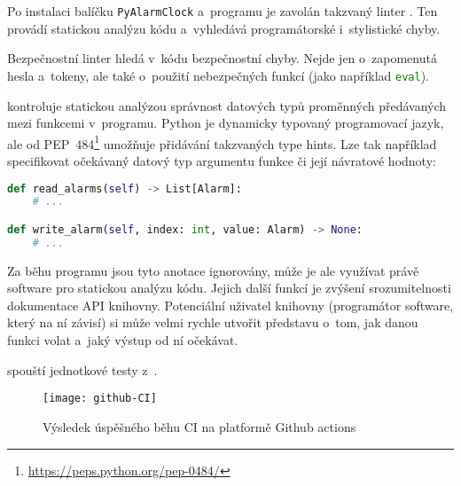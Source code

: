 Po instalaci balíčku \texttt{PyAlarmClock} a~programu  je
zavolán takzvaný linter . Ten provádí statickou analýzu kódu
a~vyhledává programátorské i~stylistické chyby.

Bezpečnostní linter  hledá v~kódu bezpečnostní chyby. Nejde
jen o~zapomenutá hesla a~tokeny, ale také o~použití nebezpečných funkcí (jako
například \lstinline[language=Python]!eval!).

 kontroluje statickou analýzou správnost datových typů
proměnných předávaných mezi funkcemi v~programu. Python je dynamicky typovaný
programovací jazyk, ale od
PEP~484\footnote{\url{https://peps.python.org/pep-0484/}} umožňuje přidávání
takzvaných \foreignlanguage{english}{type hints}. Lze tak například
specifikovat očekávaný datový typ argumentu funkce či její návratové hodnoty:
\begin{lstlisting}[language=Python]
def read_alarms(self) -> List[Alarm]:
    # ...

def write_alarm(self, index: int, value: Alarm) -> None:
    # ...
\end{lstlisting}
Za běhu programu jsou tyto anotace ignorovány, může je ale využívat právě
software pro statickou analýzu kódu. Jejich další funkcí je zvýšení
srozumitelnosti dokumentace API knihovny. Potenciální uživatel knihovny
(programátor software, který na ní závisí) si může velmi rychle utvořit
představu o~tom, jak danou funkci volat a~jaký výstup od ní očekávat.

 spouští jednotkové testy z~.

\begin{figure}[htbp]
    \centering
    \texttt{[image: github-CI]}
    \caption{Výsledek úspěšného běhu \acs{CI} na platformě Github actions}
    \label{fig:PyAlarmClock CI}
\end{figure}
